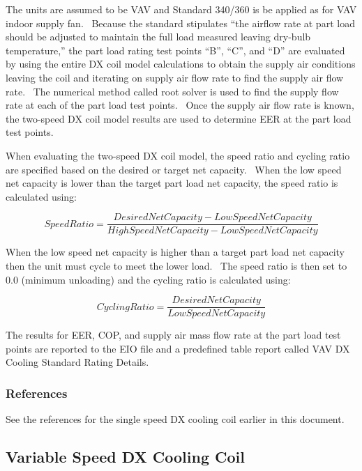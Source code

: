 The units are assumed to be VAV and Standard 340/360 is be applied as for VAV indoor supply fan.~ Because the standard stipulates ``the airflow rate at part load should be adjusted to maintain the full load measured leaving dry-bulb temperature,'' the part load rating test points ``B'', ``C'', and ``D'' are evaluated by using the entire DX coil model calculations to obtain the supply air conditions leaving the coil and iterating on supply air flow rate to find the supply air flow rate.~ The numerical method called root solver is used to find the supply flow rate at each of the part load test points.~ Once the supply air flow rate is known, the two-speed DX coil model results are used to determine EER at the part load test points.

When evaluating the two-speed DX coil model, the speed ratio and cycling ratio are specified based on the desired or target net capacity.~ When the low speed net capacity is lower than the target part load net capacity, the speed ratio is calculated using:

\begin{equation}
SpeedRatio = \frac{{DesiredNetCapacity - LowSpeedNetCapacity}}{{HighSpeedNetCapacity - LowSpeedNetCapacity}}
\end{equation}

When the low speed net capacity is higher than a target part load net capacity then the unit must cycle to meet the lower load.~ The speed ratio is then set to 0.0 (minimum unloading) and the cycling ratio is calculated using:

\begin{equation}
CyclingRatio = \frac{{DesiredNetCapacity}}{{LowSpeedNetCapacity}}
\end{equation}

The results for EER, COP, and supply air mass flow rate at the part load test points are reported to the EIO file and a predefined table report called VAV DX Cooling Standard Rating Details.

\subsubsection{References}\label{references-4-001}

See the references for the single speed DX cooling coil earlier in this document.

\subsection{Variable Speed DX Cooling Coil}\label{variable-speed-dx-cooling-coil}

